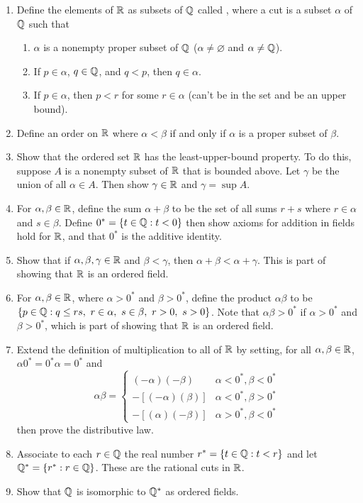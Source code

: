\documentclass{mathnotes}
\begin{document}
\begin{enumerate}
  \item Define the elements of $\mathbb{R}$ as subsets of $\mathbb{Q}$ called ,
    where a cut is a subset $\alpha$ of $\mathbb{Q}$ such that
    \begin{enumerate}
      \item $\alpha$ is a nonempty proper subset of $\mathbb{Q}$
        ($\alpha\ne\varnothing$ and $\alpha\ne\mathbb{Q}$).
      \item If $p\in\alpha$, $q\in\mathbb{Q}$, and $q<p$, then $q\in\alpha$.
      \item If $p\in\alpha$, then $p<r$ for some $r\in\alpha$ (can't be in the
        set and be an upper bound).
    \end{enumerate}
  \item Define an order on $\mathbb{R}$ where $\alpha<\beta$ if and only if $\alpha$
    is a proper subset of $\beta$.
  \item Show that the ordered set $\mathbb{R}$ has the least-upper-bound property. To
    do this, suppose $A$ is a nonempty subset of $\mathbb{R}$ that is bounded above.
    Let $\gamma$ be the union of all $\alpha\in A$. Then show $\gamma\in\mathbb{R}$
    and $\gamma=\sup A$.
  \item For $\alpha,\beta\in\mathbb{R}$, define the sum $\alpha+\beta$ to be the set
    of all sums $r+s$ where $r\in\alpha$ and $s\in\beta$. Define
    $0^*=\{t\in\mathbb{Q}:t<0\}$ then show axioms for addition in fields hold for
    $\mathbb{R}$, and that $0^*$ is the additive identity.
  \item Show that if $\alpha,\beta,\gamma\in\mathbb{R}$ and $\beta<\gamma$, then
    $\alpha+\beta<\alpha+\gamma$. This is part of showing that $\mathbb{R}$ is an
    ordered field.
  \item For $\alpha,\beta\in\mathbb{R}$, where $\alpha>0^*$ and $\beta>0^*$, define
    the product $\alpha\beta$ to be $\{p\in\mathbb{Q}:q\le rs,\ r\in\alpha,\
    s\in\beta,\ r>0,\ s>0\}$. Note that $\alpha\beta>0^*$ if $\alpha>0^*$ and
    $\beta>0^*$, which is part of showing that $\mathbb{R}$ is an ordered field.
  \item Extend the definition of multiplication to all of $\mathbb{R}$ by setting, for
    all $\alpha,\beta\in\mathbb{R}$, $\alpha0^*=0^*\alpha=0^*$ and
    $$\alpha\beta=\begin{cases}
      (-\alpha)(-\beta) & \alpha<0^*, \beta<0^*\\
      -[(-\alpha)(\beta)] & \alpha<0^*, \beta>0^*\\
      -[(\alpha)(-\beta)] & \alpha>0^*, \beta<0^*
    \end{cases}$$
    then prove the distributive law.
  \item Associate to each $r\in\mathbb{Q}$ the real number $r^*=\{t\in\mathbb{Q}:t<r\}$ and
    let $\mathbb{Q}^*=\{r^*:r\in\mathbb{Q}\}$. These are the rational cuts in $\mathbb{R}$.
  \item Show that $\mathbb{Q}$ is isomorphic to $\mathbb{Q}^*$ as ordered fields.
\end{enumerate}
\end{document}
